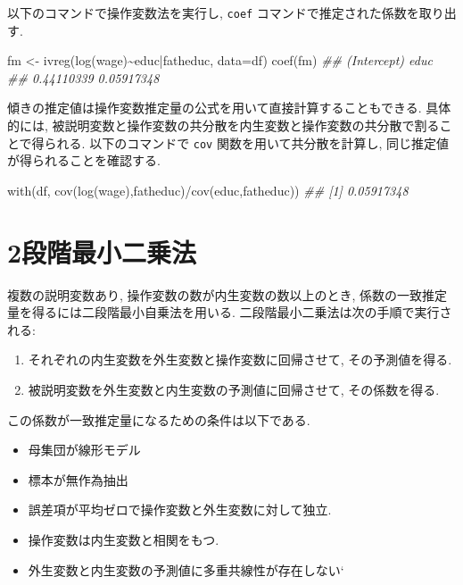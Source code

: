 \documentclass[
  letterpaper,
  xelatex,
  ja=standard, xelatex]{bxjsbook}
\newenvironment{Shaded}{\begin{snugshade}}{\end{snugshade}}
\newcommand{\AttributeTok}[1]{\textcolor[rgb]{0.40,0.45,0.13}{#1}}
\newcommand{\DocumentationTok}[1]{\textcolor[rgb]{0.37,0.37,0.37}{\textit{#1}}}
\newcommand{\FunctionTok}[1]{\textcolor[rgb]{0.28,0.35,0.67}{#1}}
\newcommand{\NormalTok}[1]{\textcolor[rgb]{0.00,0.23,0.31}{#1}}
\newcommand{\OtherTok}[1]{\textcolor[rgb]{0.00,0.23,0.31}{#1}}
\newcommand{\SpecialCharTok}[1]{\textcolor[rgb]{0.37,0.37,0.37}{#1}}
\providecommand{\tightlist}{%
  \setlength{\itemsep}{0pt}\setlength{\parskip}{0pt}}\usepackage{longtable,booktabs,array}
\begin{document}
以下のコマンドで操作変数法を実行し, \texttt{coef}
コマンドで推定された係数を取り出す.

\begin{Shaded}
\begin{Highlighting}[]
\NormalTok{fm  }\OtherTok{\textless{}{-}} \FunctionTok{ivreg}\NormalTok{(}\FunctionTok{log}\NormalTok{(wage)}\SpecialCharTok{\textasciitilde{}}\NormalTok{educ}\SpecialCharTok{|}\NormalTok{fatheduc, }\AttributeTok{data=}\NormalTok{df)}
\FunctionTok{coef}\NormalTok{(fm)}
\DocumentationTok{\#\# (Intercept)        educ }
\DocumentationTok{\#\#  0.44110339  0.05917348}
\end{Highlighting}
\end{Shaded}

傾きの推定値は操作変数推定量の公式を用いて直接計算することもできる.
具体的には,
被説明変数と操作変数の共分散を内生変数と操作変数の共分散で割ることで得られる.
以下のコマンドで \texttt{cov} 関数を用いて共分散を計算し,
同じ推定値が得られることを確認する.

\begin{Shaded}
\begin{Highlighting}[]
\FunctionTok{with}\NormalTok{(df, }\FunctionTok{cov}\NormalTok{(}\FunctionTok{log}\NormalTok{(wage),fatheduc)}\SpecialCharTok{/}\FunctionTok{cov}\NormalTok{(educ,fatheduc))}
\DocumentationTok{\#\# [1] 0.05917348}
\end{Highlighting}
\end{Shaded}

\section{2段階最小二乗法}\label{ux6bb5ux968eux6700ux5c0fux4e8cux4e57ux6cd5}

複数の説明変数あり, 操作変数の数が内生変数の数以上のとき,
係数の一致推定量を得るには二段階最小自乗法を用いる.
二段階最小二乗法は次の手順で実行される:

\begin{enumerate}
\def\labelenumi{\arabic{enumi}.}
\tightlist
\item
  それぞれの内生変数を外生変数と操作変数に回帰させて, その予測値を得る.
\item
  被説明変数を外生変数と内生変数の予測値に回帰させて, その係数を得る.
\end{enumerate}

この係数が一致推定量になるための条件は以下である.

\begin{itemize}
\tightlist
\item
  母集団が線形モデル
\item
  標本が無作為抽出
\item
  誤差項が平均ゼロで操作変数と外生変数に対して独立.
\item
  操作変数は内生変数と相関をもつ.
\item
  外生変数と内生変数の予測値に多重共線性が存在しない`
\end{itemize}
\end{document}
